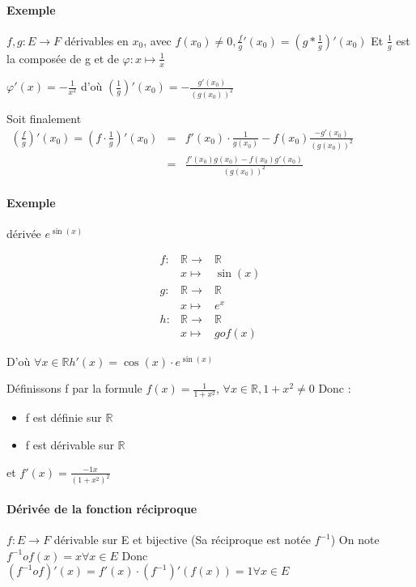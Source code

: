 \paragraph{Exemple} $f,g : E \rightarrow F$ dérivables en $x_0$, avec $f(x_0)\neq 0, \frac{f}{g}'(x_0) = (g*\frac{1}{g})'(x_0)$ Et $\frac{1}{g}$ est la composée de g et de $\varphi : x \mapsto \frac{1}{x}$

$\varphi '(x) = -\frac{1}{x^2}$ d'où $(\frac{1}{g})'(x_0) =  -\frac{g'(x_0)}{(g(x_0))^2}$

Soit finalement $ \begin{array}{rcl}
(\frac{f}{g})'(x_0) = (f\cdot\frac{1}{g})'(x_0) &=& f'(x_0)\cdot\frac{1}{g(x_0)}-f(x_0)\frac{-g'(x_0)}{(g(x_0))^2} \\
&=& \frac{f'(x_0)g(x_0)-f(x_0)g'(x_0)}{(g(x_0))^2}
\end{array}$

\paragraph{Exemple} dérivée $e^{\sin(x)}$

\[
\begin{array}{rcl}
f:&\mathbb{R} \rightarrow &\mathbb{R} \\
& x \mapsto &\sin(x) \\
g:&\mathbb{R} \rightarrow &\mathbb{R} \\
&x \mapsto &e^x \\
h:&\mathbb{R} \rightarrow &\mathbb{R} \\
&x \mapsto &gof(x) 
\end{array}\]

D'où $\forall x \in \mathbb{R} h'(x)=\cos(x)\cdot e^{\sin(x)}$

Définissons f par la formule $f(x) = \frac{1}{1+x^2}$, $\forall x \in \mathbb{R}, 1+x^2 \neq 0$ Donc :
\begin{itemize}
\item f est définie sur $\mathbb{R}$
\item f est dérivable sur $\mathbb{R}$
\end{itemize}
et $f'(x) = \frac{-1x}{(1+x^2)^2}$

\paragraph{Dérivée de la fonction réciproque}
$f:E \rightarrow F$ dérivable sur E et bijective (Sa réciproque est notée $f^{-1}$)
On note $f^{-1}of(x) = x \forall x \in E$ Donc $(f^{-1}of)'(x) = f'(x)\cdot(f^{-1})'(f(x))=1 \forall x \in E$

